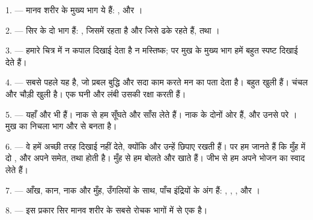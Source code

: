 
\VUsaut{4.0mm}
\VUsaut{2.0mm}

\VUsaut{2.4mm}
\VUsaut{3.0mm}

1. --- मानव शरीर के मुख्य भाग ये हैं: ,  और
।

\VUsaut{3.0mm}

2. --- सिर के दो भाग हैं: , जिसमें  रहता है और
जिसे  ढके रहते हैं, तथा ।

3. --- हमारे चित्र में न कपाल दिखाई देता है न मस्तिष्क; पर मुख के मुख्य भाग
हमें बहुत स्पष्ट दिखाई देते हैं।

4. --- सबसे पहले यह  है, जो प्रबल बुद्धि और सदा काम करते मन का
पता देता है।  बहुत खुली हैं।  चंचल और चौड़ी खुली
है। एक घनी  और लंबी  उसकी रक्षा करती हैं।

5. --- यहाँ  और  भी हैं। नाक से हम सूँघते और साँस
लेते हैं। नाक के दोनों ओर  हैं, और उनसे परे । मुख का
निचला भाग  और  से बनता है।

6. --- वे हमें अच्छी तरह दिखाई नहीं देते, क्योंकि  और
 उन्हें छिपाए रखती हैं। पर हम जानते हैं कि मुँह में दो
,  और  अपने 
समेत, तथा  होती है। मुँह से हम बोलते और खाते हैं। जीभ से हम अपने
भोजन का स्वाद लेते हैं।

7. --- आँख, कान, नाक और मुँह, उँगलियों के साथ, पाँच इंद्रियों के अंग हैं:
, , ,  और
।

8. --- इस प्रकार सिर मानव शरीर के सबसे रोचक भागों में से एक है।

\VUsaut{4.4mm}
\VUsaut{3.0mm}

